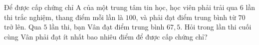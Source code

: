 \begin{ex}
Để được cấp chứng chỉ A của một trung tâm tin học, học viên phải trải qua $6$ lần thi trắc nghiệm, thang điểm mỗi lần là $100$, và phải đạt điểm trung bình từ $70$ trở lên. Qua $5$ lần thi, bạn Vân đạt điểm trung bình $67{,}5$. Hỏi trong lần thi cuối cùng Vân phải đạt ít nhất bao nhiêu điểm để được cấp chứng chỉ?
\end{ex}
